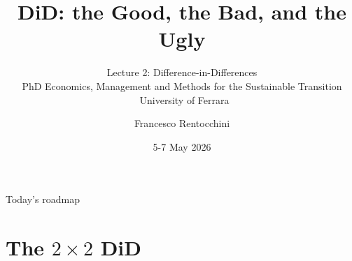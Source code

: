 \documentclass[aspectratio=169, 10pt]{beamer}
\title[DiD: the Good, the Bad, and the Ugly]{%
  DiD: the Good, the Bad, and the Ugly}
\subtitle{Lecture 2: Difference-in-Differences\\
  {\small\normalfont\color{ecgray} PhD Economics, Management and Methods for the Sustainable Transition \textbullet\ University of Ferrara}}
\author{Francesco Rentocchini}
\institute{European Commission, JRC-Seville / DEMM, University of Milan}
\date{5-7 May 2026}
\begin{document}

\begin{frame}
  \titlepage
\end{frame}

\begin{frame}{Today's roadmap}
  \tableofcontents
\end{frame}

\section{The \texorpdfstring{$2\times2$}{2x2} DiD}

\end{document}
